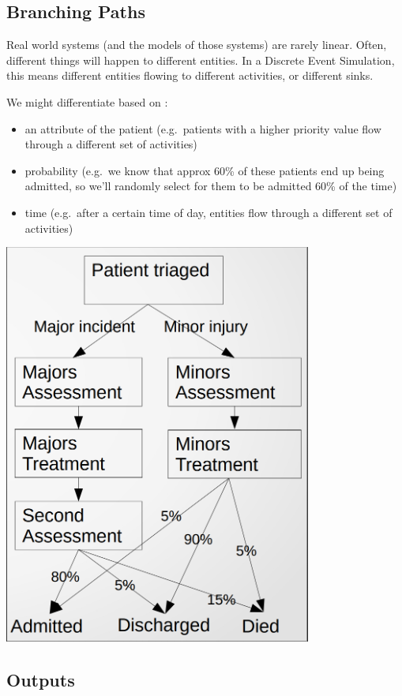 \documentclass[
  letterpaper,
  DIV=11,
  numbers=noendperiod]{scrreprt}
\providecommand{\tightlist}{%
  \setlength{\itemsep}{0pt}\setlength{\parskip}{0pt}}\usepackage{longtable,booktabs,array}
\begin{document}
\subsection{Branching Paths}\label{branching-paths}

Real world systems (and the models of those systems) are rarely linear.
Often, different things will happen to different entities. In a Discrete
Event Simulation, this means different entities flowing to different
activities, or different sinks.

We might differentiate based on :

\begin{itemize}
\tightlist
\item
  an attribute of the patient (e.g.~patients with a higher priority
  value flow through a different set of activities)
\item
  probability (e.g.~we know that approx 60\% of these patients end up
  being admitted, so we'll randomly select for them to be admitted 60\%
  of the time)
\item
  time (e.g.~after a certain time of day, entities flow through a
  different set of activities)
\end{itemize}

\includegraphics{images/branching_paths_simple.png}

\subsection{Outputs}\label{outputs}
\end{document}
